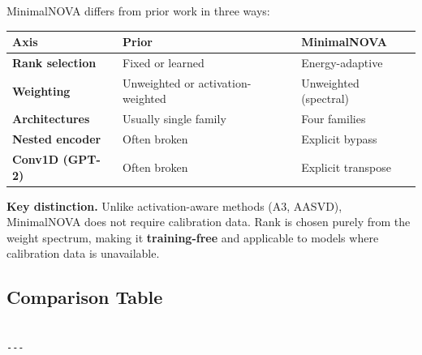 MinimalNOVA differs from prior work in three ways:

\begin{table}[H]
\centering
\small
\begin{tabular}{lll}
\toprule
\textbf{Axis} & \textbf{Prior} & \textbf{MinimalNOVA} \\
\midrule
\textbf{Rank selection} & Fixed or learned & Energy-adaptive \\
\textbf{Weighting} & Unweighted or activation-weighted & Unweighted (spectral) \\
\textbf{Architectures} & Usually single family & Four families \\
\textbf{Nested encoder} & Often broken & Explicit bypass \\
\textbf{Conv1D (GPT-2)} & Often broken & Explicit transpose \\
\bottomrule
\end{tabular}
\end{table}

\textbf{Key distinction.} Unlike activation-aware methods (A3, AASVD), MinimalNOVA 
does not require calibration data. Rank is chosen purely from the weight 
spectrum, making it \textbf{training-free} and applicable to models where 
calibration data is unavailable.



\subsection{Comparison Table}

\begin{lstlisting}

---
\end{lstlisting}